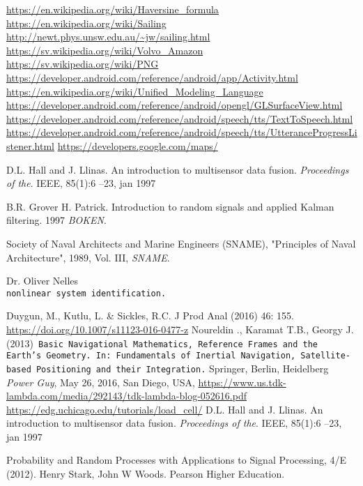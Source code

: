 \begin{thebibliography}{9}
  \url{https://en.wikipedia.org/wiki/Haversine_formula}
  \url{https://en.wikipedia.org/wiki/Sailing}
  \url{http://newt.phys.unsw.edu.au/~jw/sailing.html}
  \url{https://sv.wikipedia.org/wiki/Volvo_Amazon}
  \url{https://sv.wikipedia.org/wiki/PNG}
  \url{https://developer.android.com/reference/android/app/Activity.html}
  \url{https://en.wikipedia.org/wiki/Unified_Modeling_Language}
  \url{https://developer.android.com/reference/android/opengl/GLSurfaceView.html}
  \url{https://developer.android.com/reference/android/speech/tts/TextToSpeech.html}
  \url{https://developer.android.com/reference/android/speech/tts/UtteranceProgressListener.html}
  \url{https://developers.google.com/maps/}

D.L. Hall and J. Llinas. An introduction to multisensor data fusion. 
\textit{Proceedings of the}. IEEE, 85(1):6 –23, jan 1997

B.R. Grover H. Patrick. Introduction to random signals and applied Kalman filtering. 1997
\textit{BOKEN}. 

Society of Naval Architects and Marine Engineers (SNAME), "Principles of Naval Architecture", 1989, Vol. III,
\textit{SNAME}. 

 
Dr. Oliver Nelles
\\\texttt{nonlinear system identification.}

Duygun, M., Kutlu, L. \& Sickles, R.C. J Prod Anal (2016) 46: 155. \url{https://doi.org/10.1007/s11123-016-0477-z}
Noureldin ., Karamat T.B., Georgy J. (2013)\texttt{ Basic Navigational Mathematics, Reference Frames and the Earth’s Geometry. In: Fundamentals of Inertial Navigation, Satellite-based Positioning and their Integration.} Springer, Berlin, Heidelberg
\emph{Power Guy}, May 26, 2016, San Diego, USA,
  \url{https://www.us.tdk-lambda.com/media/292143/tdk-lambda-blog-052616.pdf}
  \url{https://edg.uchicago.edu/tutorials/load_cell/}
D.L. Hall and J. Llinas. An introduction to multisensor data fusion. 
\textit{Proceedings of
the}. IEEE, 85(1):6 –23, jan 1997

Probability and Random Processes with Applications to Signal Processing, 4/E (2012). 
Henry Stark, John W Woods. Pearson Higher Education. 


\end{thebibliography}
